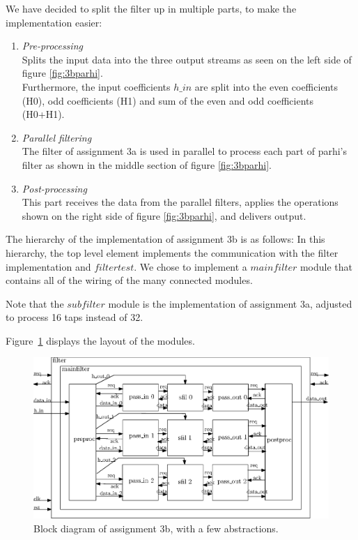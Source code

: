 \documentclass[a4paper,twoside,11pt, fleqn]{article}
\begin{document}
We have decided to split the filter up in multiple parts, to make the implementation easier:
\begin{enumerate}
	\item \textit{Pre-processing} \\
		Splits the input data into the three output streams as seen on the left side of figure	\ref{fig:3bparhi}. \\
		Furthermore, the input coefficients $h\_in$ are split into the even coefficients (H0), odd coefficients (H1) and sum of the even and odd coefficients (H0+H1).

	\item \textit{Parallel filtering} \\
	The filter of assignment 3a is used in parallel to process each part of parhi's filter as shown in the middle section of figure	\ref{fig:3bparhi}.
	
	\item \textit{Post-processing} \\
	This part receives the data from the parallel filters, applies the operations shown on the right side of figure \ref{fig:3bparhi}, and delivers output.
\end{enumerate}

The hierarchy of the implementation of assignment 3b is as follows: 
In this hierarchy, the top level element implements the communication with the filter implementation and $filtertest$. We chose to implement a $mainfilter$ module that contains all of the wiring of the many connected modules.

Note that the $subfilter$ module is the implementation of assignment 3a, adjusted to process 16 taps instead of 32.

Figure~\ref{fig:3bblockdiag} displays the layout of the modules.
\begin{figure}[h]
	\centering
	\includegraphics[scale=1.0]{./Images/3b_blockdiagram.eps}
	\caption{Block diagram of assignment 3b, with a few abstractions.}
	\label{fig:3bblockdiag}
\end{figure}
\end{document}
